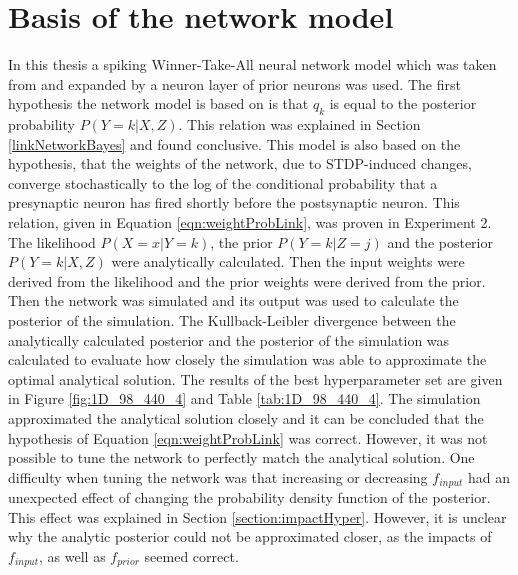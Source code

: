 \section{Basis of the network model}
\label{basisOfModel}
In this thesis a spiking Winner-Take-All neural network model which was taken from \citet{nessler} and expanded by a neuron layer of prior neurons was used. The first hypothesis the network model is based on is that $q_k$ is equal to the posterior probability $P(Y = k|X, Z)$. This relation was explained in Section \ref{linkNetworkBayes} and found conclusive. This model is also based on the hypothesis, that the weights of the network, due to STDP-induced changes, converge stochastically to the log of the conditional probability that a presynaptic neuron has fired shortly before the postsynaptic neuron. This relation, given in Equation \ref{eqn:weightProbLink}, was proven in Experiment 2. The likelihood $P(X=x|Y=k)$, the prior $P(Y=k|Z=j)$ and the posterior $P(Y = k|X, Z)$ were analytically calculated. Then the input weights were derived from the likelihood and the prior weights were derived from the prior. Then the network was simulated and its output was used to calculate the posterior of the simulation. The Kullback-Leibler divergence between the analytically calculated posterior and the posterior of the simulation was calculated to evaluate how closely the simulation was able to approximate the optimal analytical solution. The results of the best hyperparameter set are given in Figure \ref{fig:1D_98_440_4} and Table \ref{tab:1D_98_440_4}. The simulation approximated the analytical solution closely and it can be concluded that the hypothesis of Equation \ref{eqn:weightProbLink} was correct. However, it was not possible to tune the network to perfectly match the analytical solution. One difficulty when tuning the network was that increasing or decreasing $f_{input}$ had an unexpected effect of changing the probability density function of the posterior. This effect was explained in Section \ref{section:impactHyper}. However, it is unclear why the analytic posterior could not be approximated closer, as the impacts of $f_{input}$, as well as $f_{prior}$ seemed correct.

